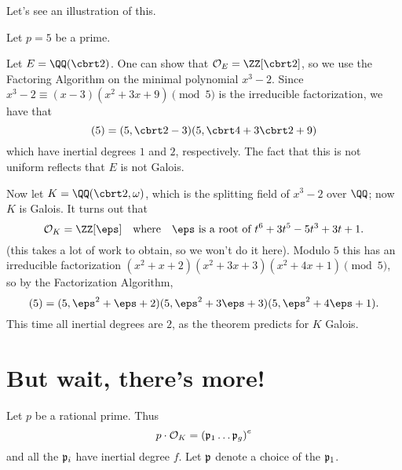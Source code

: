 Let's see an illustration of this.
\begin{example}
	Let $p = 5$ be a prime.
	\begin{enumerate}[(a)]
		\ii Let $E = \QQ(\cbrt2)$.
		One can show that $\OO_E = \ZZ[\cbrt2]$, so 
		we use the Factoring Algorithm on the minimal polynomial $x^3-2$.
		Since $x^3-2 \equiv (x-3)(x^2+3x+9) \pmod 5$ is the irreducible factorization,
		we have that
		\[ (5) = (5,\cbrt2-3)(5, \cbrt4+3\cbrt2+9) \]
		which have inertial degrees $1$ and $2$, respectively.
		The fact that this is not uniform reflects that $E$ is not Galois.

		\ii Now let $K = \QQ(\cbrt2,\omega)$, which is the splitting
		field of $x^3-2$ over $\QQ$; now $K$ is Galois.
		It turns out that
		\[ \OO_K = \ZZ[\eps] \quad\text{where}\quad \eps \text { is a root of } t^6+3t^5-5t^3+3t+1. \]
		(this takes a lot of work to obtain, so we won't do it here).
		Modulo $5$ this has an irreducible factorization
		$(x^2+x+2)(x^2+3x+3)(x^2+4x+1) \pmod 5$,
		so by the Factorization Algorithm,
		\[ (5) = (5, \eps^2+\eps+2)(5, \eps^2+3\eps+3)(5, \eps^2+4\eps+1). \]
		This time all inertial degrees are $2$, as the theorem predicts for $K$ Galois.
	\end{enumerate}
\end{example}

\section{But wait, there's more!}
Let $p$ be a rational prime.
Thus
\[ p \cdot \mathcal O_K = \left( \mathfrak p_1 \dots \mathfrak p_g \right)^e \]
and all the $\mathfrak p_i$ have inertial degree $f$.
Let $\mathfrak p$ denote a choice of the $\mathfrak p_1$.

